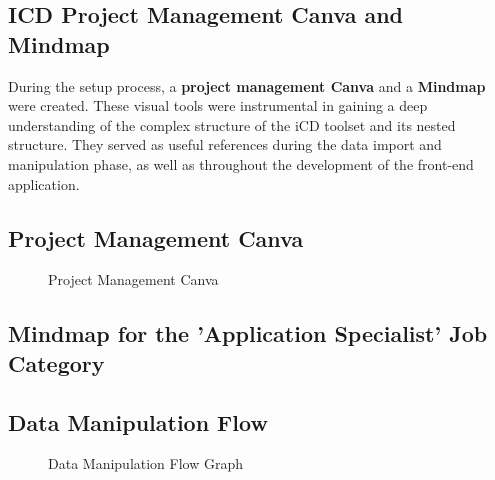 \subsection{ICD Project Management Canva and Mindmap}

During the setup process, a {\color{limeGreen}\textbf{project management Canva}} and a {\color{limeGreen}\textbf{Mindmap}} were created. These visual tools were instrumental in gaining a deep  
understanding of the complex structure of the iCD toolset and its nested structure. 
They served as useful references during the data import and manipulation phase, as well as throughout the development of the front-end application.


\subsection{Project Management Canva}
\begin{figure}[H]
    \centering
    \caption{ Project Management Canva }
    \label{fig: Project-Management-Canva}
\end{figure}

\newpage
\subsection*{Mindmap for the 'Application Specialist' Job Category}

\newpage
\subsection{Data Manipulation Flow}
\begin{figure}[H]
    \centering
    \caption{ Data Manipulation Flow Graph }
    \label{fig: Data_Manipulation_Flow_Graph}
\end{figure}



